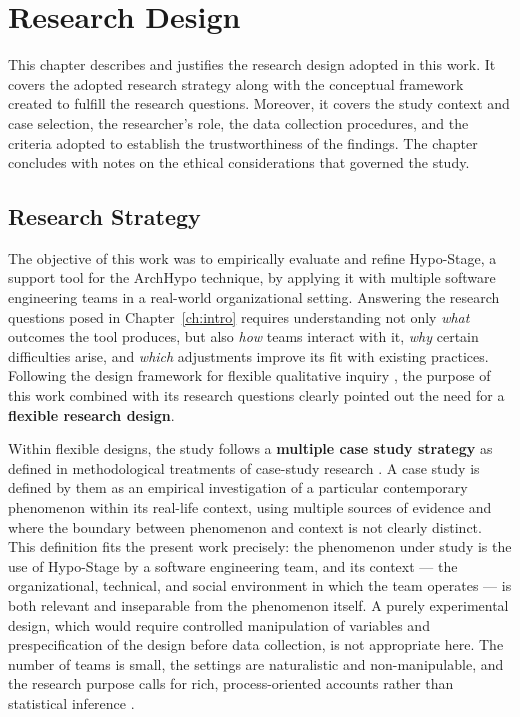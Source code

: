 
\chapter{Research Design}
\label{ch:method}
\label{chap:research-design}

This chapter describes and justifies the research design adopted in this work.
It covers the adopted research strategy along with the conceptual framework created to fulfill the research
questions. Moreover, it covers the study context and case selection, the researcher's role, the data collection procedures, and the criteria adopted to establish the trustworthiness of the findings. 
The chapter concludes with notes on the ethical considerations that governed the study.

\section{Research Strategy}

The objective of this work was to empirically evaluate and refine Hypo-Stage,
a support tool for the ArchHypo technique, by applying it with multiple software
engineering teams in a real-world organizational setting. Answering the research
questions posed in Chapter~\ref{ch:intro} requires understanding not only \emph{what}
outcomes the tool produces, but also \emph{how} teams interact with it, \emph{why}
certain difficulties arise, and \emph{which} adjustments improve its fit with existing
practices. Following the design framework for flexible qualitative inquiry \citep{robson2016}, the purpose of this work combined with its research questions clearly pointed out the need for a \textbf{flexible research design}.

Within flexible designs, the study follows a \textbf{multiple case study strategy} as defined in methodological treatments of case-study research \citep{robson2016,yin2009}.
A case study is defined by them as an empirical investigation of a particular contemporary
phenomenon within its real-life context, using multiple sources of evidence and where
the boundary between phenomenon and context is not clearly distinct. This definition
fits the present work precisely: the phenomenon under study is the use of Hypo-Stage
by a software engineering team, and its context --- the organizational, technical, and
social environment in which the team operates --- is both relevant and inseparable
from the phenomenon itself. A purely experimental design, which would require
controlled manipulation of variables and prespecification of the design before data
collection, is not appropriate here. The number of teams is small, the settings are
naturalistic and non-manipulable, and the research purpose calls for rich,
process-oriented accounts rather than statistical inference \citep{robson2016}.

